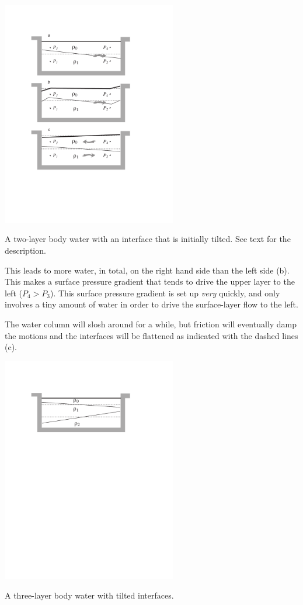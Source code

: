 \begin{marginfigure}
  \centering
  \includegraphics[width=3in]{figs/PdiffTiltInt}
  \caption{A two-layer body water with an interface that is initially
    tilted. See text for the description. }
  \label{fig:PdiffTiltInt}
\end{marginfigure}


This leads to more water, in total, on the right hand side than the left side (b).  This makes a surface pressure gradient that tends to drive the upper layer to the left ($P_4>P_3$). This surface pressure gradient is set up \emph{very} quickly, and only involves a tiny amount of water in order to drive the surface-layer flow to the left.

The water column will slosh around for a while, but friction will eventually damp the motions and the interfaces will be flattened as indicated with the dashed lines (c).

\begin{marginfigure}
  \centering
  \includegraphics[width=3in]{figs/PdiffTilt3Int}
  \caption{A three-layer body water with tilted interfaces. }
  \label{fig:PdiffTilt3Int}
\end{marginfigure}


